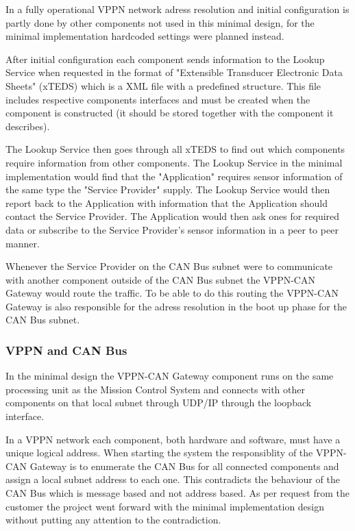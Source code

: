 In a fully operational VPPN network adress resolution and initial
configuration is partly done by other components not used in this minimal
design, for the minimal implementation hardcoded settings were planned instead.

After initial configuration each component sends information to the
Lookup Service when requested in the format of "Extensible Transducer Electronic Data Sheets"
(xTEDS) which is a XML file with a predefined structure. This file includes
respective components interfaces and must be created when the component is
constructed (it should be stored together with the component it describes).

The Lookup Service then goes through all xTEDS to find out which components
require information from other components. The Lookup Service in the minimal
implementation would find that the "Application" requires sensor information of
the same type the "Service Provider" supply. The Lookup Service would then report
back to the Application with information that the Application should contact
the Service Provider. The Application would then ask ones for required data or
subscribe to the Service Provider's sensor information in a peer to peer manner.

Whenever the Service Provider on the CAN Bus subnet were to communicate
with another component outside of the CAN Bus subnet the VPPN-CAN Gateway
would route the traffic. To be able to do this routing the VPPN-CAN Gateway is also
responsible for the adress resolution in the boot up phase for the CAN Bus
subnet.

\subsubsection{VPPN and CAN Bus}\label{subsubsec:vppn_can_bus}
In the minimal design the VPPN-CAN Gateway component runs on the same
processing unit as the Mission Control System and connects with other
components on that local subnet through UDP/IP through the loopback interface.

In a VPPN network each component, both hardware and software, must have a unique
logical address. When starting the system the responsiblity of the VPPN-CAN Gateway is to
enumerate the CAN Bus for all connected components and assign a local subnet address to
each one. This contradicts the behaviour of the CAN Bus which is message based
and not address based. As per request from the customer the project went
forward with the minimal implementation design without putting any attention to
the contradiction.

